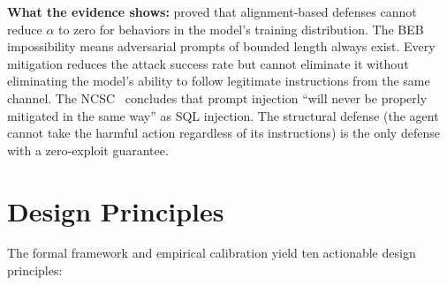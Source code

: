 \documentclass[11pt, a4paper, copyright]{googledeepmind}
\begin{document}
\textbf{What the evidence shows:} \citet{wolf2024fundamental} proved that alignment-based defenses cannot reduce $\alpha$ to zero for behaviors in the model's training distribution. The BEB impossibility means adversarial prompts of bounded length always exist. Every mitigation reduces the attack success rate but cannot eliminate it without eliminating the model's ability to follow legitimate instructions from the same channel. The NCSC~\citep{ncsc2023prompt} concludes that prompt injection ``will never be properly mitigated in the same way'' as SQL injection. The structural defense (the agent cannot take the harmful action regardless of its instructions) is the only defense with a zero-exploit guarantee.


\section{Design Principles}
\label{sec:principles}

The formal framework and empirical calibration yield ten actionable design principles:
\end{document}
